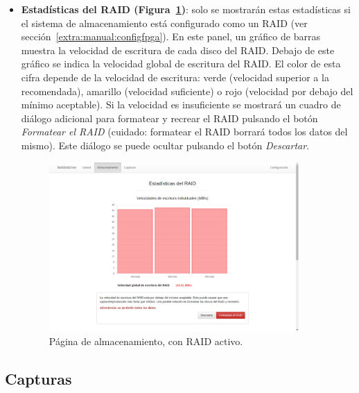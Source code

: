 \begin{itemize}
\item \textbf{Estadísticas del \gls{RAID} (Figura~\ref{fig:captura:raid})}: solo se mostrarán estas estadísticas si el sistema de almacenamiento está configurado como un \gls{RAID} (ver sección~\ref{extra:manual:configfpga}).
En este panel, un gráfico de barras muestra la velocidad de escritura de cada disco del \gls{RAID}.
Debajo de este gráfico se indica la velocidad global de escritura del \gls{RAID}.
El color de esta cifra depende de la velocidad de escritura: verde (velocidad superior a la recomendada), amarillo (velocidad suficiente) o rojo (velocidad por debajo del mínimo aceptable).
Si la velocidad es insuficiente se mostrará un cuadro de diálogo adicional para formatear y recrear el \gls{RAID} pulsando el botón \textit{Formatear el \gls{RAID}} (cuidado: formatear el \gls{RAID} borrará todos los datos del mismo).
Este diálogo se puede ocultar pulsando el botón \textit{Descartar}.
\begin{figure}[!htp]
  \centering
  \includegraphics[width=0.9\textwidth,clip=true]{graphics/capturas/almacenamiento_raid}
  \caption{Página de almacenamiento, con \gls{RAID} activo.}
  \label{fig:captura:raid}
\end{figure}
\end{itemize}


\subsection{Capturas\label{extra:manual:capturas}}


